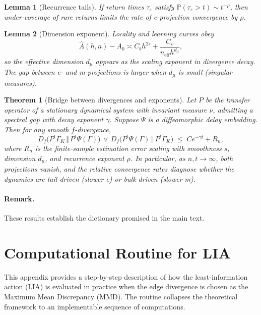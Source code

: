 \documentclass[11pt]{article}
\newtheorem{lemma}{Lemma}
\newtheorem{theorem}{Theorem}
\newcommand{\1}{\mathbf{1}}
\begin{document}
\begin{lemma}[Recurrence tails]
If return times $\tau_\varepsilon$ satisfy $\mathbb P(\tau_\varepsilon > t) \sim t^{-\rho}$, then under-coverage of rare returns limits the rate of e-projection convergence by $\rho$.
\end{lemma}

\begin{lemma}[Dimension exponent]
Locality and learning curves obey
\[
\hat A(h,n)-A_0 \asymp C_b h^{2s} + \frac{C_v}{n_{\mathrm{eff}} h^{d_\mu}},
\]
so the effective dimension $d_\mu$ appears as the scaling exponent in divergence decay. The gap between e- and m-projections is larger when $d_\mu$ is small (singular measures).
\end{lemma}

\begin{theorem}[Bridge between divergences and exponents]
Let $P$ be the transfer operator of a stationary dynamical system with invariant measure $\nu$, admitting a spectral gap with decay exponent $\gamma$. Suppose $\Psi$ is a diffeomorphic delay embedding. Then for any smooth $f$-divergence,
\[
D_f\!\big(P^t\Gamma_K \,\Vert\, P^t\Psi(\Gamma)\big) \,\vee\, D_f\!\big(P^t\Psi(\Gamma)\,\Vert\, P^t\Gamma_K\big)
\;\le\; C e^{-\gamma t} + R_n,
\]
where $R_n$ is the finite-sample estimation error scaling with smoothness $s$, dimension $d_\mu$, and recurrence exponent $\rho$. In particular, as $n,t\to\infty$, both projections vanish, and the relative convergence rates diagnose whether the dynamics are tail-driven (slower e) or bulk-driven (slower m).
\end{theorem}

\paragraph{Remark.} These results establish the dictionary promised in the main text.

\section{Computational Routine for LIA}

This appendix provides a step-by-step description of how the least-information action (LIA) is evaluated in practice when the edge divergence is chosen as the Maximum Mean Discrepancy (MMD). The routine collapses the theoretical framework to an implementable sequence of computations.
\end{document}
